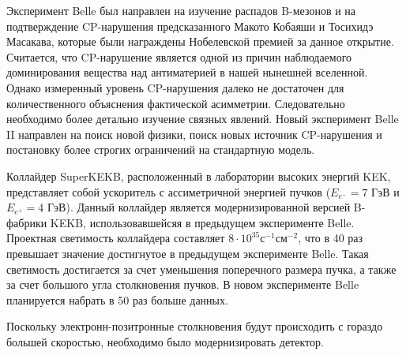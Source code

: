   Эксперимент Belle был направлен на изучение распадов B-мезонов и на подтверждение CP-нарушения предсказанного Макото Кобаяши и Тосихидэ Масакава, которые были награждены Нобелевской премией за данное открытие. Считается, что CP-нарушение является одной из причин наблюдаемого доминирования вещества над антиматерией в нашей нынешней вселенной. Однако измеренный уровень CP-нарушения далеко не достаточен для количественного объяснения фактической асимметрии. Следовательно необходимо более детально изучение связных явлений. Новый эксперимент Belle II направлен на поиск новой физики, поиск новых источник CP-нарушения и постановку более строгих ограничений на стандартную модель.\par 
Коллайдер SuperKEKB, расположенный в лаборатории высоких энергий KEK, представляет собой ускоритель с ассиметричной энергией пучков ($E_{e^-}=7$ ГэВ и $E_{e^+}=4$ ГэВ). Данный коллайдер является модернизированной версией B-фабрики KEKB, использовавшейсяя в предыдущем эксперименте Belle. Проектная светимость коллайдера составляет $8\cdot10^{35}$с$^{-1}$см$^{-2}$, что в 40 раз превышает значение достигнутое в предыдущем эксперименте Belle. Такая светимость достигается за счет уменьшения поперечного размера пучка, а также за счет большого угла столкновения пучков. В новом эксперименте Belle планируется набрать в 50 раз больше данных.\par
  Поскольку электронн-позитронные столкновения будут происходить с гораздо большей скоростью, необходимо было модернизировать детектор.
